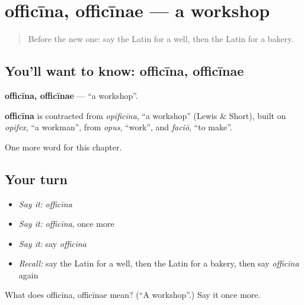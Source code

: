 \section[officīna, officīnae]{officīna, officīnae — a workshop}

\label{lesson:LA-C118-officina}



\begin{quote}
Before the new one: say the Latin for a well, then the Latin for a bakery.
\end{quote}

\subsection*{You'll want to know: officīna, officīnae}
\textbf{officīna, officīnae} — \textquotedblleft{}a workshop\textquotedblright{}.

\begin{cousinweb}
\textbf{officīna} is contracted from \emph{opificīna}, \textquotedblleft{}a workshop\textquotedblright{} (Lewis \& Short), built on \emph{opifex}, \textquotedblleft{}a workman\textquotedblright{}, from \emph{opus}, \textquotedblleft{}work\textquotedblright{}, and \emph{faciō}, \textquotedblleft{}to make\textquotedblright{}.
\end{cousinweb}

\begin{grammarlens}[title={What you've built}]
One more word for this chapter.
\end{grammarlens}

\subsection*{Your turn}
\begin{itemize}
\raggedright
  \item \emph{Say it:} \emph{officīna}
  \item \emph{Say it:} \emph{officīna}, once more
  \item \emph{Say it:} say \emph{officīna}
  \item \emph{Recall:} say the Latin for a well, then the Latin for a bakery, then say \emph{officīna} again
\end{itemize}

\begin{tcolorbox}[breakable,colback=teal!4,colframe=teal!35!black,title={Before you move on}]
What does officīna, officīnae mean? (\textquotedblleft{}A workshop\textquotedblright{}.) Say it once more.
\end{tcolorbox}
